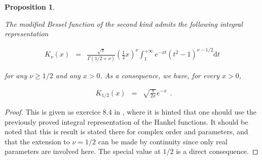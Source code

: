 \documentclass{jams-l}
\newtheorem{proposition}[theorem]{Proposition}
\theoremstyle{definition}
\theoremstyle{remark}
\numberwithin{equation}{section}
\begin{document}
        \begin{proposition}
        \label{PropIntegralRepModifiedBessel}
        
            The modified Bessel function of the second kind admits the following integral representation
            
            \[ \begin{array}{lll}
                    K_{\nu} \left( x \right) & = & \frac{\sqrt{\pi}}{\Gamma \left( 1/2 + \nu \right)} \left( \frac{1}{2} x \right)^{\nu} \int_1^{+ \infty} e^{-xt} \left( t^2 - 1 \right)^{\nu - 1/2} \mathrm{d}t
                \end{array} \]
            
            \noindent for any $\nu \geqslant 1/2$ and any $x > 0$. As a consequence, we have, for every $x > 0$,
            
            \[ \begin{array}{lll}
                    K_{1/2} \left( x \right) & = & \sqrt{\frac{\pi}{2x}} e^{-x}
                \end{array} . \]
        
        \end{proposition}
        
        \begin{proof}
        
            This is given as exercice $8.4$ in \cite[Sec. 7.8]{MR1429619}, where it is hinted that one should use the previously proved integral representation of the Hankel functions. It should be noted that this is result is stated there for complex order and parameters, and that the extension to $\nu = 1/2$ can be made by continuity since only real parameters are involved here. The special value at $1/2$ is a direct consequence.
        
        \end{proof}
        
\end{document}
